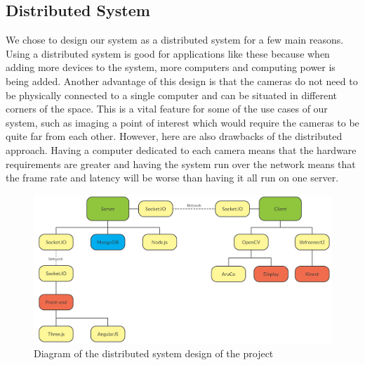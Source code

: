\documentclass{article}
\begin{document}
\subsection{Distributed System}
We chose to design our system as a distributed system for a few main reasons. Using a distributed system is good for applications like these because when adding more devices to the system, more computers and computing power is being added.
Another advantage of this design is that the cameras do not need to be physically connected to a single computer and can be situated in different corners of the space. This is a vital feature for some of the use cases of our system, such as imaging a point of interest which would require the cameras to be quite far from each other. However, here are also drawbacks of the distributed approach. Having a computer dedicated to each camera means that the hardware requirements are greater and having the system run over the network means that the frame rate and latency will be worse than having it all run on one server.
\begin{figure}[h]
  \centering
  \includegraphics[scale=0.35]{distributed}
  \caption{Diagram of the distributed system design of the project}
\end{figure}
\newpage
\end{document}
